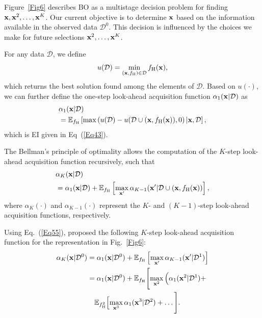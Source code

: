 \documentclass[iicol,sn-basic]{sn-jnl}%
\theoremstyle{thmstyleone}%
\theoremstyle{thmstyletwo}
\theoremstyle{thmstylethree}
\begin{document}
\begin{linenumbers}
Figure~\ref{Fig6} describes BO as a multistage decision problem for finding ${\bf x},{\bf x}^2,\dots,{\bf x}^{K}$.
Our current objective is to determine $\bf x$ based on the information available in the observed data $\mathcal{D}^0$.
This decision is influenced by the choices we make for future selections ${\bf x}^2,\dots,{\bf x}^{K}$.

For any data $\mathcal{D}$, we define
\begin{equation}\label{Eq53}
	u(\mathcal{D}) = \underset{({\bf x},f_{\text{H}}) \in \mathcal{D}}{\min}\,f_{\text{H}}({\bf x}),
\end{equation} 
which returns the best solution found among the elements of $\mathcal{D}$.
Based on $u(\cdot)$, we can further define the one-step look-ahead acquisition function $\alpha_1({\bf x}|\mathcal{D})$ as
\begin{equation}\label{Eq54}
	\begin{aligned}
	&\alpha_1({\bf x}|\mathcal{D})\\
	&=\mathbb{E}_{f_\text{H}}\left[\max\left(u(\mathcal{D}) - u(\mathcal{D} \cup ({\bf x},f_\text{H}({\bf x})),0\right)
	|{\bf x},\mathcal{D}\right],
	\end{aligned}
\end{equation} 
which is EI given in Eq~(\ref{Eq43}).

The Bellman's principle of optimality allows the computation of the $K$-step look-ahead acquisition function recursively, such that
\begin{equation}\label{Eq55}
	\begin{aligned}
	&\alpha_K({\bf x}|\mathcal{D})\\
	& =\alpha_1({\bf x}|\mathcal{D}) + \mathbb{E}_{f_\text{H}}\left[\underset{\bf x'}{\max}\,\alpha_{K-1}({\bf x}'|\mathcal{D} \cup ({\bf x},f_\text{H}({\bf x}))\right],
\end{aligned}
\end{equation}
where $\alpha_K(\cdot)$ and $\alpha_{K-1}(\cdot)$ represent the $K$- and $(K-1)$-step look-ahead acquisition functions, respectively.

Using Eq.~(\ref{Eq55}), \cite{Jiang2020} proposed the following $K$-step look-ahead acquisition function for the representation in Fig.~\ref{Fig6}:
\begin{equation}\label{Eq56}
	\begin{aligned}
		\alpha_K({\bf x}|\mathcal{D}^0) & =\alpha_1({\bf x}|\mathcal{D}^0) + \mathbb{E}_{f_\text{H}}\left[\underset{\bf x'}{\max}\,\alpha_{K-1}({\bf x}'|\mathcal{D}^1)\right] \\
		& = \alpha_1({\bf x}|\mathcal{D}^0) +\mathbb{E}_{f_\text{H}}\Bigg[\underset{{\bf x}^2}{\max}\,\Big(\alpha_1({{\bf x}}^2|\mathcal{D}^1) + \\
		& \quad \mathbb{E}_{f_\text{H}^2}\Big[\underset{{\bf x}^3}{\max}\,\alpha_1({\bf x}^3|\mathcal{D}^2)+\dots  \Bigg].
	\end{aligned}
\end{equation}


\end{linenumbers}
\end{document}
